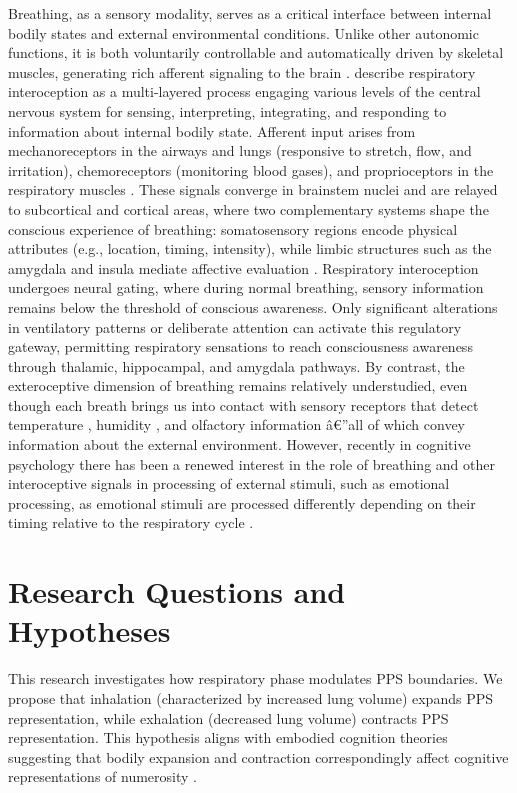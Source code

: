 Breathing, as a sensory modality, serves as a critical interface between internal bodily states and external environmental conditions. Unlike other autonomic functions, it is both voluntarily controllable and automatically driven by skeletal muscles, generating rich afferent signaling to the brain \citep{Betka2022}. \citet{Chan2024} describe respiratory interoception as a multi-layered process engaging various levels of the central nervous system for sensing, interpreting, integrating, and responding to information about internal bodily state. Afferent input arises from mechanoreceptors in the airways and lungs (responsive to stretch, flow, and irritation), chemoreceptors (monitoring blood gases), and proprioceptors in the respiratory muscles \citep{Varga2017}. These signals converge in brainstem nuclei and are relayed to subcortical and cortical areas, where two complementary systems shape the conscious experience of breathing: somatosensory regions encode physical attributes (e.g., location, timing, intensity), while limbic structures such as the amygdala and insula mediate affective evaluation \citep{Chan2024}. Respiratory interoception undergoes neural gating, where during normal breathing, sensory information remains below the threshold of conscious awareness. Only significant alterations in ventilatory patterns or deliberate attention can activate this regulatory gateway, permitting respiratory sensations to reach consciousness awareness through thalamic, hippocampal, and amygdala pathways. By contrast, the exteroceptive dimension of breathing remains relatively understudied, even though each breath brings us into contact with sensory receptors that detect temperature \citep{burgess1988effects, garefis2023human}, humidity \citep{Chan2024}, and olfactory information \citep{Mainland2006}â€”all of which convey information about the external environment. However, recently in cognitive psychology there has been a renewed interest in the role of breathing and other interoceptive signals in processing of external stimuli, such as emotional processing, as emotional stimuli are processed differently depending on their timing relative to the respiratory cycle \citep{Zelano2022}.

\section{Research Questions and Hypotheses}

This research investigates how respiratory phase modulates PPS boundaries. We propose that inhalation (characterized by increased lung volume) expands PPS representation, while exhalation (decreased lung volume) contracts PPS representation. This hypothesis aligns with embodied cognition theories suggesting that bodily expansion and contraction correspondingly affect cognitive representations of numerosity \citep{belli2021breathink}.

